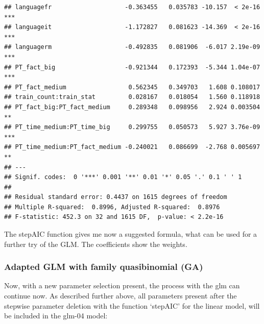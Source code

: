 \documentclass[
]{article}
\begin{document}
\begin{verbatim}
## languagefr                    -0.363455   0.035783 -10.157  < 2e-16 ***
## languageit                    -1.172827   0.081623 -14.369  < 2e-16 ***
## languagerm                    -0.492835   0.081906  -6.017 2.19e-09 ***
## PT_fact_big                   -0.921344   0.172393  -5.344 1.04e-07 ***
## PT_fact_medium                 0.562345   0.349703   1.608 0.108017    
## train_count:train_stat         0.028167   0.018054   1.560 0.118918    
## PT_fact_big:PT_fact_medium     0.289348   0.098956   2.924 0.003504 ** 
## PT_time_medium:PT_time_big     0.299755   0.050573   5.927 3.76e-09 ***
## PT_time_medium:PT_fact_medium -0.240021   0.086699  -2.768 0.005697 ** 
## ---
## Signif. codes:  0 '***' 0.001 '**' 0.01 '*' 0.05 '.' 0.1 ' ' 1
## 
## Residual standard error: 0.4437 on 1615 degrees of freedom
## Multiple R-squared:  0.8996, Adjusted R-squared:  0.8976 
## F-statistic: 452.3 on 32 and 1615 DF,  p-value: < 2.2e-16
\end{verbatim}

The stepAIC function gives me now a suggested formula, what can be used
for a further try of the GLM. The coefficients show the weights.

\hypertarget{adapted-glm-with-family-quasibinomial-ga}{%
\subsubsection{Adapted GLM with family quasibinomial
(GA)}\label{adapted-glm-with-family-quasibinomial-ga}}

Now, with a new parameter selection present, the process with the glm
can continue now. As described further above, all parameters present
after the stepwise parameter deletion with the function `stepAIC' for
the linear model, will be included in the glm-04 model:
\end{document}
